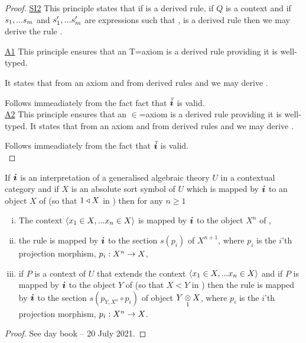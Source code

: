 \begin{proof}
\vspace{1cm}
\underline{SI2} 
This principle states that if  is a derived rule, if $Q$ is a context and if  $\sm$ and $\smp$ are expressions such that
\foreachj,  is a derived rule then we may derive the rule
. \\
\vspace{1cm}

\underline{A1} 
This principle ensures that an T=axiom is a derived rule providing it is well-typed.
 
It states that from an axiom  and from derived rules
 \ZDelta and \ZDeltap we may derive
.

\vspace{1cm}
Follows immeadiately from the fact fact that $\Ibar$ is  valid.\\

\underline{A2} 
This principle ensures that an $\in$=axiom is a derived rule providing it is well-typed.
It states that from an axiom  and from derived rules
 \ZtDelta and \ZtpDelta we may derive
.

\vspace{1cm}
Follows immeadiately from the fact that $\Ibar$ is  valid. \\

\end{proof}

\begin{lemma}
If $\iI$ is an interpretation of a generalised algebraic theory $U$ in a contextual category \catcw and if $X$ is an absolute sort symbol of $U$ which is mapped 
by $\iI$ to an object $X$ of \catcw (so that $1 \base X$ in \catc) then for any $n \geq 1$ 
\begin{enumerate}[(i)]
\item
The context $\tuple{\ofT{x_1}{X},...\ofT{x_n}{X}}$ is mapped by $\iI$ to the object $X^n$ of \catc,
\item the rule 
 is mapped by $\iI$ to the section $s(p_i)$ of $X^{n+1}$, where $p_i$ is the $i$'th projection morphism, $p_i: X^n \morph X$,
\item if $P$ is a context of $U$ that extends the context $\tuple{\ofT{x_1}{X},...\ofT{x_n}{X}}$ and if $P$ is mapped by $\iI$ to
the object $Y$ of \catcw (so that $X < Y$ in \catc) then the rule 
 is mapped by $\iI$ to the section $s(p_{Y,X^n}\circ p_i)$ of object $\crossx{Y}{X}{1}$, where $p_i$ is the $i$'th projection morphism, $p_i: X^n \morph X$.
\end{enumerate}
\end{lemma}
\begin{proof}
See day book -- 20 July 2021.
\end{proof}

